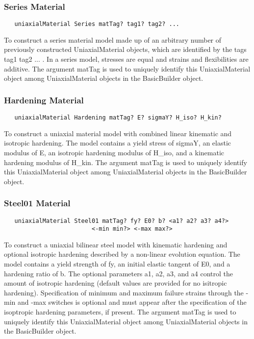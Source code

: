 \documentclass[12pt]{article}
\begin{document}
\subsubsection{Series Material}
{\sf\small
\begin{verbatim}
   uniaxialMaterial Series matTag? tag1? tag2? ... 
\end{verbatim}
}

\noindent To construct a series material model made up of an
arbitrary number of previously constructed UniaxialMaterial objects, 
which are identified by the tags tag1 tag2 ... . In a series model,
stresses are equal and strains and flexibilities are additive. The argument matTag 
is used to uniquely identify this UniaxialMaterial object among UniaxialMaterial objects
in the BasicBuilder object.

\subsubsection{Hardening Material}
{\sf\small
\begin{verbatim}
   uniaxialMaterial Hardening matTag? E? sigmaY? H_iso? H_kin?
\end{verbatim}
}

\noindent To construct a uniaxial material model with combined linear kinematic
and isotropic hardening. The model contains a yield stress of sigmaY, an
elastic modulus of E, an isotropic hardening modulus of H\_iso, and a
kinematic hardening modulus of H\_kin. The argument matTag is used to 
uniquely identify this UniaxialMaterial object among UniaxialMaterial objects
in the BasicBuilder object.

\subsubsection{Steel01 Material}
{\sf\small
\begin{verbatim}
   uniaxialMaterial Steel01 matTag? fy? E0? b? <a1? a2? a3? a4?> 
                         <-min min?> <-max max?>
\end{verbatim}
}

\noindent To construct a uniaxial bilinear steel model with kinematic
hardening and optional isotropic hardening described by a non-linear
evolution equation. The model contains a yield strength of fy, an
initial elastic tangent of E0, and a hardening ratio of b. The
optional parameters a1, a2, a3, and a4 control the amount of isotropic
hardening (default values are provided for no isitropic
hardening). Specification of minimum and maximum failure strains 
through the -min and -max switches is optional and must appear after
the specification of the isoptropic hardening parameters, if
present. The argument matTag is used to uniquely identify this
UniaxialMaterial object among UniaxialMaterial objects in the
BasicBuilder object. 
\end{document}
